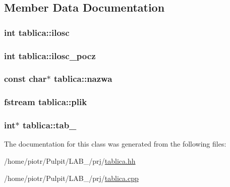 \subsection{\-Member \-Data \-Documentation}
\hypertarget{classtablica_af78b1ba93fce972d87e7ce98ae93c8cc}{
\subsubsection[{ilosc}]{\setlength{\rightskip}{0pt plus 5cm}int {\bf tablica\-::ilosc}}}\label{classtablica_af78b1ba93fce972d87e7ce98ae93c8cc}
\hypertarget{classtablica_a3073633c65ed1e1972d93f8634181b13}{
\subsubsection[{ilosc\-\_\-pocz}]{\setlength{\rightskip}{0pt plus 5cm}int {\bf tablica\-::ilosc\-\_\-pocz}}}\label{classtablica_a3073633c65ed1e1972d93f8634181b13}
\hypertarget{classtablica_a8a732fa361987ccec1dfcf35f21087dd}{
\subsubsection[{nazwa}]{\setlength{\rightskip}{0pt plus 5cm}const char$\ast$ {\bf tablica\-::nazwa}}}\label{classtablica_a8a732fa361987ccec1dfcf35f21087dd}
\hypertarget{classtablica_adc72ca2e658dc620ee1d9a88de2349f4}{
\subsubsection[{plik}]{\setlength{\rightskip}{0pt plus 5cm}fstream {\bf tablica\-::plik}}}\label{classtablica_adc72ca2e658dc620ee1d9a88de2349f4}
\hypertarget{classtablica_a6733b3a13cea82d3e650af56c23ac976}{
\subsubsection[{tab\-\_\-1}]{\setlength{\rightskip}{0pt plus 5cm}int$\ast$ {\bf tablica\-::tab\-\_}}}\label{classtablica_a6733b3a13cea82d3e650af56c23ac976}


\-The documentation for this class was generated from the following files\-:\begin{DoxyCompactItemize}
\item 
/home/piotr/\-Pulpit/\-L\-A\-B\-\_/prj/\hyperlink{tablica_8hh}{tablica.\-hh}\item 
/home/piotr/\-Pulpit/\-L\-A\-B\-\_/prj/\hyperlink{tablica_8cpp}{tablica.\-cpp}\end{DoxyCompactItemize}
